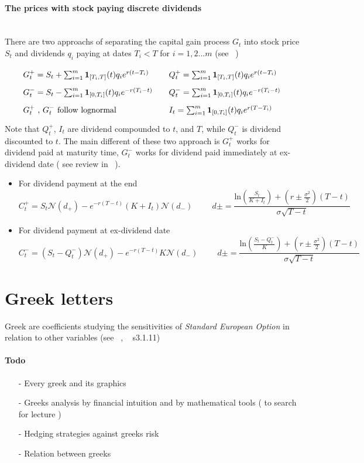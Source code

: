 \documentclass[a4paper,10pt]{article}
\begin{document}
\paragraph{The prices with stock paying discrete dividends} \mbox{} \\
There are two approachs of separating the capital gain process $G_t$ into stock price $S_t$ and dividends $q_i$ paying at dates $T_i<T$ for $i=1,2...m$ (see ~\cite{MAREK})
\[\def\arraystretch{1.8}
\begin{array}{lll}
G^+_t         = S_t + \sum^m_{i=1} \mathbf{1}_{[T_i,T]}(t) q_i e^{r(t-T_i)} & & Q^+_t =  \sum^m_{i=1} \mathbf{1}_{[T_i,T]}(t)  q_i e^{r(t-T_i)} \\
G^-_t = S_t - \sum^m_{i=1} \mathbf{1}_{[0,T_i]}(t) q_i e^{-r(T_i-t)}& & Q^-_t = \sum^m_{i=1} \mathbf{1}_{[0,T_i]}(t)  q_i e^{-r(T_i-t)} \\
G^+_t \text{ , } G^-_t \text{ follow lognormal } & & I_t = \sum^m_{i=1} \mathbf{1}_{[0,T_i]}(t)  q_i e^{r(T-T_i)} 
\end{array}
\]
Note that $Q^+_t$, $I_t$ are dividend compounded to $t$, and $T$, while $Q^-_t$ is dividend discounted to $t$. The main different of these two approach is $G^+_t$ works for dividend paid at maturity time, $G^-_t$ works for dividend paid immediately at ex-dividend date ( see review in ~\cite{CarlosVeiga2008}). 
\begin{itemize}
 \item For dividend payment at the end
\[
C^+_t = S_t \mathcal{N}(d_+) - e^{-r(T-t)} (K+I_t)\mathcal{N}(d_-)
\hspace{1cm}
d\pm = \frac{\text{ln}(\frac{S_t}{K+I_t}) + (r\pm \frac{\sigma^2}{2})(T-t) }{\sigma\sqrt{T-t}}
\]
 \item For dividend payment at ex-dividend date
\[
C^-_t = (S_t-Q^-_t) \mathcal{N}(d_+) - e^{-r(T-t)} K \mathcal{N}(d_-)
\hspace{1cm}
d\pm = \frac{\text{ln}(\frac{S_t-Q^-_t}{K}) + (r\pm \frac{\sigma^2}{2})(T-t) }{\sigma\sqrt{T-t}}
\] 
\end{itemize}

\section{Greek letters}
Greek are coefficients studying the sensitivities of \textit{Standard European Option} in relation to other variables (see ~\cite{Claudio2013}, ~\cite{MAREK} s3.1.11)

\paragraph{Todo}
\begin{itemize}
 \item[-] Every greek and its graphics
 \item[-] Greeks analysis by financial intuition and by mathematical tools ( to search for lecture )
 \item[-] Hedging strategies against greeks risk
 \item[-] Relation between greeks
\end{itemize}
\end{document}
